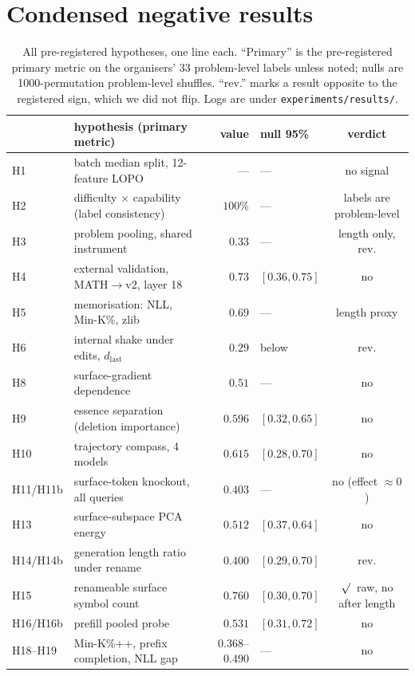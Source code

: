 \documentclass[10pt]{article}
\providecommand{\checkmark}{\ensuremath{\surd}}
\newcommand{\X}{\checkmark}
\begin{document}
\section{Condensed negative results}
\label{app:negatives}
\begin{table}[h]
\centering\small
\caption{All pre-registered hypotheses, one line each. ``Primary'' is the pre-registered primary
metric on the organisers' 33 problem-level labels unless noted; nulls are 1000-permutation
problem-level shuffles. ``rev.'' marks a result opposite to the registered sign, which we did not
flip. Logs are under \texttt{experiments/results/}.}
\label{tab:negatives}
\begin{tabular}{llrlc}
\toprule
 & hypothesis (primary metric) & value & null 95\% & verdict \\
\midrule
H1 & batch median split, 12-feature LOPO & --- & --- & no signal \\
H2 & difficulty $\times$ capability (label consistency) & $100\%$ & --- & labels are problem-level \\
H3 & problem pooling, shared instrument & $0.33$ & --- & length only, rev. \\
H4 & external validation, MATH$\to$v2, layer 18 & $0.73$ & $[0.36,0.75]$ & no \\
H5 & memorisation: NLL, Min-K\%, zlib & $0.69$ & --- & length proxy \\
H6 & internal shake under edits, $d_{\text{last}}$ & $0.29$ & below & rev. \\
H8 & surface-gradient dependence & $0.51$ & --- & no \\
H9 & essence separation (deletion importance) & $0.596$ & $[0.32,0.65]$ & no \\
H10 & trajectory compass, 4 models & $0.615$ & $[0.28,0.70]$ & no \\
H11/H11b & surface-token knockout, all queries & $0.403$ & --- & no (effect $\approx 0$) \\
H13 & surface-subspace PCA energy & $0.512$ & $[0.37,0.64]$ & no \\
H14/H14b & generation length ratio under rename & $0.400$ & $[0.29,0.70]$ & rev. \\
H15 & renameable surface symbol count & $0.760$ & $[0.30,0.70]$ & \X\ raw, no after length \\
H16/H16b & prefill pooled probe & $0.531$ & $[0.31,0.72]$ & no \\
H18--H19 & Min-K\%++, prefix completion, NLL gap & $0.368$--$0.490$ & --- & no \\

\end{tabular}
\end{table}
\end{document}
